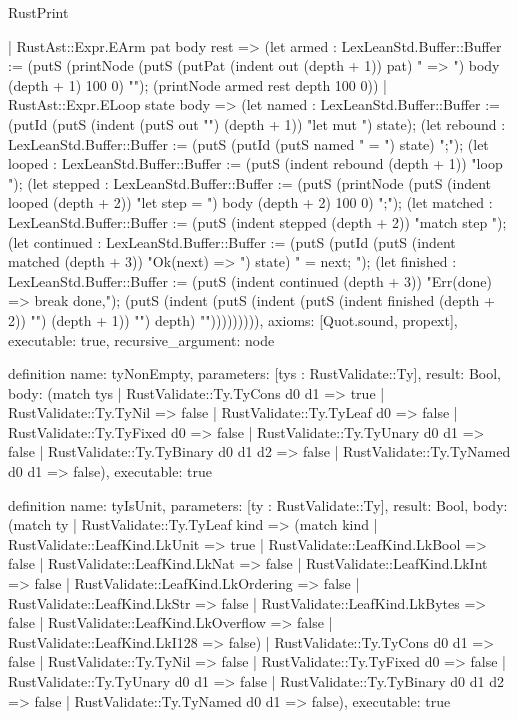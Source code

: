 \begin{lexlean}{RustPrint}
\begin{semanticmodule}
{    | RustAst::Expr.EArm pat body rest => (let armed : LexLeanStd.Buffer::Buffer := (putS (printNode (putS (putPat (indent out (depth + 1)) pat) " => ") body (depth + 1) 100 0) "\n"); (printNode armed rest depth 100 0))
    | RustAst::Expr.ELoop state body => (let named : LexLeanStd.Buffer::Buffer := (putId (putS (indent (putS out "{\n") (depth + 1)) "let mut ") state); (let rebound : LexLeanStd.Buffer::Buffer := (putS (putId (putS named " = ") state) ";\n"); (let looped : LexLeanStd.Buffer::Buffer := (putS (indent rebound (depth + 1)) "loop {\n"); (let stepped : LexLeanStd.Buffer::Buffer := (putS (printNode (putS (indent looped (depth + 2)) "let step = ") body (depth + 2) 100 0) ";\n"); (let matched : LexLeanStd.Buffer::Buffer := (putS (indent stepped (depth + 2)) "match step {\n"); (let continued : LexLeanStd.Buffer::Buffer := (putS (putId (putS (indent matched (depth + 3)) "Ok(next) => { ") state) " = next; }\n"); (let finished : LexLeanStd.Buffer::Buffer := (putS (indent continued (depth + 3)) "Err(done) => break done,\n"); (putS (indent (putS (indent (putS (indent finished (depth + 2)) "}\n") (depth + 1)) "}\n") depth) "}"))))))))),
  axioms: [Quot.sound, propext],
  executable: true,
  recursive_argument: node
}

definition{
  name: tyNonEmpty,
  parameters: [tys : RustValidate::Ty],
  result: Bool,
  body: (match tys
    | RustValidate::Ty.TyCons d0 d1 => true
    | RustValidate::Ty.TyNil => false
    | RustValidate::Ty.TyLeaf d0 => false
    | RustValidate::Ty.TyFixed d0 => false
    | RustValidate::Ty.TyUnary d0 d1 => false
    | RustValidate::Ty.TyBinary d0 d1 d2 => false
    | RustValidate::Ty.TyNamed d0 d1 => false),
  executable: true
}

definition{
  name: tyIsUnit,
  parameters: [ty : RustValidate::Ty],
  result: Bool,
  body: (match ty
    | RustValidate::Ty.TyLeaf kind => (match kind
      | RustValidate::LeafKind.LkUnit => true
      | RustValidate::LeafKind.LkBool => false
      | RustValidate::LeafKind.LkNat => false
      | RustValidate::LeafKind.LkInt => false
      | RustValidate::LeafKind.LkOrdering => false
      | RustValidate::LeafKind.LkStr => false
      | RustValidate::LeafKind.LkBytes => false
      | RustValidate::LeafKind.LkOverflow => false
      | RustValidate::LeafKind.LkI128 => false)
    | RustValidate::Ty.TyCons d0 d1 => false
    | RustValidate::Ty.TyNil => false
    | RustValidate::Ty.TyFixed d0 => false
    | RustValidate::Ty.TyUnary d0 d1 => false
    | RustValidate::Ty.TyBinary d0 d1 d2 => false
    | RustValidate::Ty.TyNamed d0 d1 => false),
  executable: true
}


\end{semanticmodule}
\end{lexlean}
